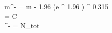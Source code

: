 \ln m^- = \ln m - 1.96 \sigma \cdot (e ^ {1.96 \sigma}) ^ {0.315}\\
\sigma =  {\sqrt C}\\
\mu^- =  {N_{tot}}